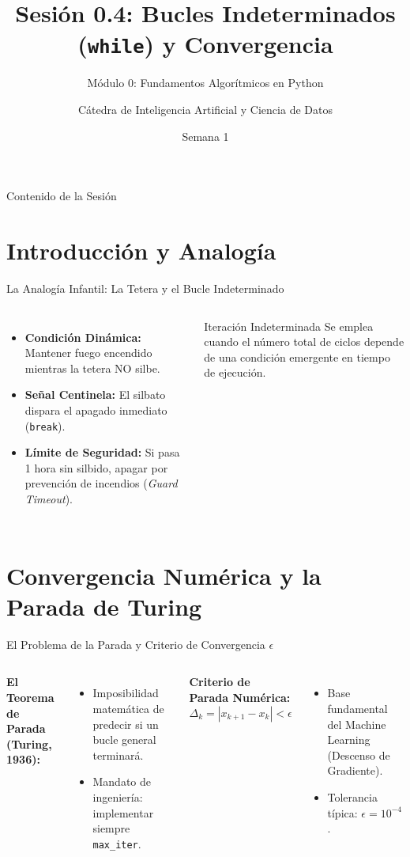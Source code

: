 \documentclass[aspectratio=169]{beamer}
\title[INT210 - Sesión 0.4]{Sesión 0.4: Bucles Indeterminados (\texttt{while}) y Convergencia}
\subtitle{Módulo 0: Fundamentos Algorítmicos en Python}
\author[Diplomado en Ciencia de Datos]{Cátedra de Inteligencia Artificial y Ciencia de Datos}
\institute[INT210]{Machine Learning From Scratch}
\date{Semana 1}
\begin{document}
\frame{\titlepage}

\begin{frame}{Contenido de la Sesión}
    \tableofcontents
\end{frame}

\section{Introducción y Analogía}

\begin{frame}{La Analogía Infantil: La Tetera y el Bucle Indeterminado}
    \begin{columns}
        \begin{itemize}
            \item \textbf{Condición Dinámica:} Mantener fuego encendido mientras la tetera NO silbe.
            \item \textbf{Señal Centinela:} El silbato dispara el apagado inmediato (\texttt{break}).
            \item \textbf{Límite de Seguridad:} Si pasa 1 hora sin silbido, apagar por prevención de incendios (\textit{Guard Timeout}).
        \end{itemize}
        \begin{alertblock}{Iteración Indeterminada}
            Se emplea cuando el número total de ciclos depende de una condición emergente en tiempo de ejecución.
        \end{alertblock}
    \end{columns}
\end{frame}

\section{Convergencia Numérica y la Parada de Turing}

\begin{frame}{El Problema de la Parada y Criterio de Convergencia $\epsilon$}
    \begin{columns}
        \textbf{El Teorema de Parada (Turing, 1936):}
        \begin{itemize}
            \item Imposibilidad matemática de predecir si un bucle general terminará.
            \item Mandato de ingeniería: implementar siempre \texttt{max\_iter}.
        \end{itemize}
        \textbf{Criterio de Parada Numérica:}
        \begin{equation*}
            \Delta_k = |x_{k+1} - x_k| < \epsilon
        \end{equation*}
        \begin{itemize}
            \item Base fundamental del Machine Learning (Descenso de Gradiente).
            \item Tolerancia típica: $\epsilon = 10^{-4}$.
        \end{itemize}
    \end{columns}
\end{frame}
\end{document}
